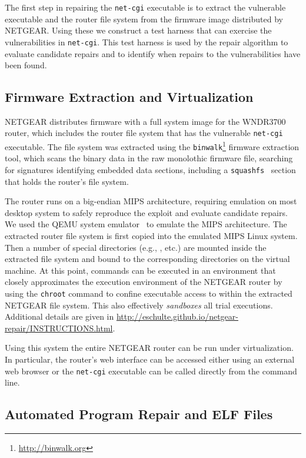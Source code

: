 \documentclass{sig-alternate}
\begin{document}
The first step in repairing the \texttt{net-cgi} executable is to
extract the vulnerable executable and the router file system from the
firmware image distributed by NETGEAR.  Using these we construct a
test harness that can exercise the vulnerabilities in
\texttt{net-cgi}.  This test harness is used by the repair algorithm
to evaluate candidate repairs and to identify when repairs to the
vulnerabilities have been found.

\subsection{Firmware Extraction and Virtualization}
\label{sec-3-1}
NETGEAR distributes firmware with a full system image for the WNDR3700
router, which includes the router file system that has the vulnerable
\texttt{net-cgi} executable.  The file system was extracted using the
\texttt{binwalk}\footnote{\url{http://binwalk.org}} firmware
extraction tool, which scans the binary data in the raw monolothic
firmware file, searching for signatures identifying embedded data
sections, including a {\tt squashfs}~\cite{lougher2006squashfs}
section that holds the router's file system.

The router runs on a big-endian MIPS architecture, requiring emulation
on most desktop system to safely reproduce the exploit and evaluate
candidate repairs. We used the QEMU system
emulator~\cite{bellard2005qemu} to emulate the MIPS architecture.
The extracted router file system is first copied into
the emulated MIPS Linux system.  Then a number of special directories
(e.g., ,  etc.) are mounted inside the
extracted file system and bound to the corresponding directories on
the virtual machine.  At this point, commands can be executed in an
environment that closely approximates the execution environment of the
NETGEAR router by using the \texttt{chroot} command to confine
executable access to within the extracted NETGEAR file system.  This
also effectively {\em sandboxes} all trial executions.  Additional
details are given in
\url{http://eschulte.github.io/netgear-repair/INSTRUCTIONS.html}.

Using this system the entire NETGEAR router can be run under
virtualization.  In particular, the router's web interface can be
accessed either using an external web browser or the \texttt{net-cgi}
executable can be called directly from the command line.

\subsection{Automated Program Repair and ELF Files}
\label{sec-3-2}
\end{document}
